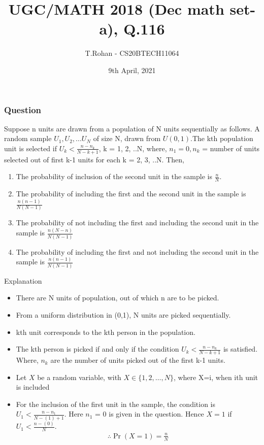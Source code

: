 \documentclass{beamer}
\title{UGC/MATH 2018 (Dec math set-a), Q.116}
\author{T.Rohan - CS20BTECH11064}
\date{9th April, 2021}
\providecommand{\pr}[1]{\ensuremath{\Pr\left(#1\right)}}
\begin{document}
\begin{frame}
\titlepage
\end{frame}

\begin{frame}
\frametitle{Question}

\begin{block}{}
 Suppose n units are drawn from a population of N units sequentially as follows. A random sample $U_1, U_2, ... U_N$ of size N, drawn from $U(0, 1)$.The kth population unit is selected if $U_k<\frac{n-n_k}{N-k+1}$, k = 1, 2, ..N, where, $n_1=0, n_k$ = number of units selected out of first k-1 units for each k = 2, 3, ..N. Then,
\begin{enumerate}[1.]
    \item The probability of inclusion of the second unit in the sample is $\frac{n}{N}$.
    \item The probability of including the first and the second unit in the sample is 
          $\frac{n(n-1)}{N(N-1)}$
    \item The probability of not including the first and including the second unit in the sample is              $\frac{n(N-n)}{N(N-1)}$
    \item The probability of including the first and not including the second unit in the sample is              $\frac{n(n-1)}{N(N-1)}$
\end{enumerate}
\end{block}
\end{frame}
\begin{frame}{}
    \begin{block}{Explanation}
    \begin{itemize}
        \item There are N units of population, out of which n are to be picked.
        \item From a uniform distribution in (0,1), N units are picked sequentially.
        \item kth unit corresponds to the kth person in the population.
        \item The kth person is picked if and only if the condition $U_k<\frac{n-n_k}{N-k+1}$ is satisfied.       Where, $n_k$ are the number of units picked out of the first k-1 units.
        \item Let $X$ be a random variable, with $X \in \{1, 2,\dots, N\}$, where X=i, when ith unit is        included
        \item For the inclusion of the first unit in the sample, the condition is $U_1<\frac{n-n_1}{N-(1)+1}$. Here          $n_1$ = 0 is given in the question. Hence $X=1$ if $U_1<\frac{n-(0)}{N}$. 
              \begin{align}
                  \therefore \pr{X=1} = \frac{n}{N} \label{eq1}
              \end{align}
    \end{itemize}
    \end{block}
\end{frame}
\end{document}
